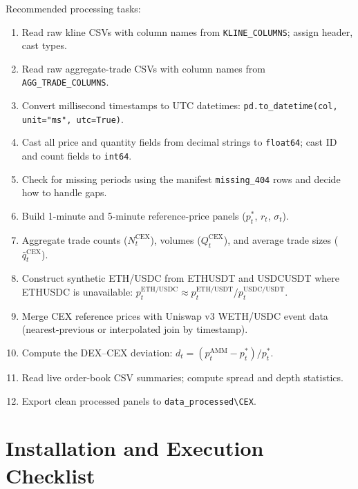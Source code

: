 \documentclass[11pt,a4paper]{article}
\begin{document}
Recommended processing tasks:
\begin{enumerate}
  \item Read raw kline CSVs with column names from
        \texttt{KLINE\_COLUMNS}; assign header, cast types.
  \item Read raw aggregate-trade CSVs with column names from
        \texttt{AGG\_TRADE\_COLUMNS}.
  \item Convert millisecond timestamps to UTC datetimes:
        \texttt{pd.to\_datetime(col, unit="ms", utc=True)}.
  \item Cast all price and quantity fields from decimal strings to
        \texttt{float64}; cast ID and count fields to \texttt{int64}.
  \item Check for missing periods using the manifest
        \texttt{missing\_404} rows and decide how to handle gaps.
  \item Build 1-minute and 5-minute reference-price panels
        ($p_t^{*}$, $r_t$, $\sigma_t$).
  \item Aggregate trade counts ($N_t^{\mathrm{CEX}}$), volumes
        ($Q_t^{\mathrm{CEX}}$), and average trade sizes
        ($\bar{q}_t^{\mathrm{CEX}}$).
  \item Construct synthetic ETH/USDC from ETHUSDT and USDCUSDT
        where ETHUSDC is unavailable:
        $p^{\mathrm{ETH/USDC}}_t \approx p^{\mathrm{ETH/USDT}}_t
        / p^{\mathrm{USDC/USDT}}_t$.
  \item Merge CEX reference prices with Uniswap v3 WETH/USDC event
        data (nearest-previous or interpolated join by timestamp).
  \item Compute the DEX--CEX deviation:
        $d_t = (p_t^{\mathrm{AMM}} - p_t^{*}) / p_t^{*}$.
  \item Read live order-book CSV summaries; compute spread and
        depth statistics.
  \item Export clean processed panels to
        \texttt{data\_processed\textbackslash CEX}.
\end{enumerate}

\section{Installation and Execution Checklist}
\label{sec:checklist}
\end{document}
